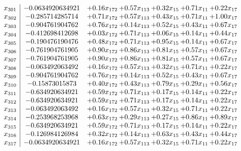 \documentclass[8pt]{article}
\begin{document}
\[\begin{array}{c| c c@{\hskip 2pt} c@{\hskip 2pt} c@{\hskip 2pt} c@{\hskip 2pt} c@{\hskip 2pt} }
 x_{301}   &  -0.0634920634921 & +  0.16 x_{172} & +  0.57 x_{113} & +  0.32 x_{15} & +  0.71 x_{11} & +  0.22 x_{17}\\
 x_{302}   &  -0.285714285714 & +  0.71 x_{172} & +  0.57 x_{113} & +  0.43 x_{15} & +  0.71 x_{11} & +  1.00 x_{17}\\
 x_{303}   &  -0.904761904762 & +  0.76 x_{172} & +  0.14 x_{113} & +  0.52 x_{15} & +  0.43 x_{11} & +  0.67 x_{17}\\
 x_{304}   &  -0.412698412698 & +  0.03 x_{172} & +  0.71 x_{113} & +  0.06 x_{15} & +  0.14 x_{11} & +  0.44 x_{17}\\
 x_{305}   &  -0.190476190476 & +  0.48 x_{172} & +  0.71 x_{113} & +  0.95 x_{15} & +  0.14 x_{11} & +  0.67 x_{17}\\
 x_{306}   &  -0.761904761905 & +  0.90 x_{172} & +  0.86 x_{113} & +  0.81 x_{15} & +  0.57 x_{11} & +  0.67 x_{17}\\
 x_{307}   &  -0.761904761905 & +  0.90 x_{172} & +  0.86 x_{113} & +  0.81 x_{15} & +  0.57 x_{11} & +  0.67 x_{17}\\
 x_{308}   &  -0.063492063492 & +  0.16 x_{172} & +  0.57 x_{113} & +  0.32 x_{15} & +  0.71 x_{11} & +  0.22 x_{17}\\
 x_{309}   &  -0.904761904762 & +  0.76 x_{172} & +  0.14 x_{113} & +  0.52 x_{15} & +  0.43 x_{11} & +  0.67 x_{17}\\
 x_{310}   &  -0.15873015873 & +  0.40 x_{172} & +  0.43 x_{113} & +  0.79 x_{15} & +  0.29 x_{11} & +  0.56 x_{17}\\
 x_{311}   &  -0.634920634921 & +  0.59 x_{172} & +  0.71 x_{113} & +  0.17 x_{15} & +  0.14 x_{11} & +  0.22 x_{17}\\
 x_{312}   &  -0.634920634921 & +  0.59 x_{172} & +  0.71 x_{113} & +  0.17 x_{15} & +  0.14 x_{11} & +  0.22 x_{17}\\
 x_{313}   &  -0.063492063492 & +  0.16 x_{172} & +  0.57 x_{113} & +  0.32 x_{15} & +  0.71 x_{11} & +  0.22 x_{17}\\
 x_{314}   &  -0.253968253968 & +  0.63 x_{172} & +  0.29 x_{113} & +  0.27 x_{15} & +  0.86 x_{11} & +  0.89 x_{17}\\
 x_{315}   &  -0.634920634921 & +  0.59 x_{172} & +  0.71 x_{113} & +  0.17 x_{15} & +  0.14 x_{11} & +  0.22 x_{17}\\
 x_{316}   &  -0.126984126984 & +  0.32 x_{172} & +  0.14 x_{113} & +  0.63 x_{15} & +  0.43 x_{11} & +  0.44 x_{17}\\
 x_{317}   &  -0.0634920634921 & +  0.16 x_{172} & +  0.57 x_{113} & +  0.32 x_{15} & +  0.71 x_{11} & +  0.22 x_{17}\\

\end{array}\]
\end{document}
